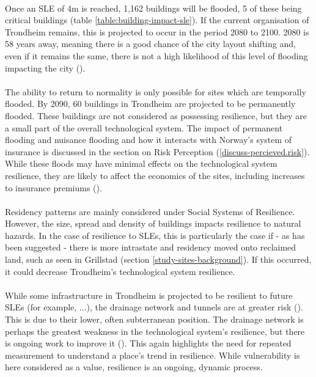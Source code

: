 \paragraph{}
Once an SLE of 4m is reached, 1,162 buildings will be flooded, 5 of these being critical buildings (table \ref{table:building-impact-sle}). If the current organisation of Trondheim remains, this is projected to occur in the period 2080 to 2100. 2080 is 58 years away, meaning there is a good chance of the city layout shifting and, even if it remains the same, there is not a high likelihood of this level of flooding impacting the city (\cite{kartverket_se_2021}).  
\paragraph{}
The ability to return to normality is only possible for sites which are temporally flooded. By 2090, 60 buildings in Trondheim are projected to be permanently flooded. These buildings are not considered as possessing resilience, but they are a small part of the overall technological system. The impact of permanent flooding and nuisance flooding and how it interacts with Norway's system of insurance is discussed in the section on Risk Perception (\ref{discuss-percieved.risk}). While these floods may have minimal effects on the technological system resilience, they are likely to affect the economics of the sites, including increases to insurance premiums (\cite{cutter_community_2020}). 
\paragraph{}
Residency patterns are mainly considered under Social Systems of Resilience. However, the size, spread and density of buildings impacts resilience to natural hazards. In the case of resilience to SLEs, this is particularly the case if - as has been suggested - there is more intrastate and residency moved onto reclaimed land, such as seen in Grillstad (section \ref{study-sites-background}). If this occurred, it could decrease Trondheim's technological system resilience.
\paragraph{}
While some infrastructure in Trondheim is projected to be resilient to future SLEs (for example, ...), the drainage network and tunnels are at greater risk (\cite{hanssen_saksframlegg_2013}). This is due to their lower, often subterranean position. The drainage network is perhaps the greatest weakness in the technological system's resilience, but there is ongoing work to improve it (\cite{hanssen_saksframlegg_2013}). This again highlights the need for repeated measurement to understand a place's trend in resilience. While vulnerability is here considered as a value, resilience is an ongoing, dynamic process.
